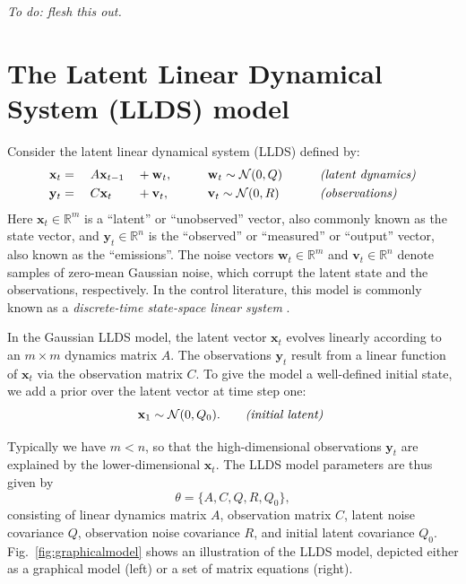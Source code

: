 \documentclass[10pt]{article}
\newcommand{\vx}{\mathbf{x}}
\newcommand{\vw}{\mathbf{w}}
\newcommand{\vy}{\mathbf{y}}
\newcommand{\vv}{\mathbf{v}}
\renewcommand{\RR}{\mathbb{R}}
\begin{document}
{\it To do: flesh this out.}

\section{The Latent Linear Dynamical System (LLDS) model} %


Consider the latent linear dynamical system (LLDS) defined by:
\begin{alignat}{5}
  \label{eq:latent}
  \vx_{t} &=\;&& A \vx_{t-1} &&+ \vw_t, \qquad && \vw_t \sim \Nrm(0,Q)
  \qquad  && \text{\it(latent dynamics)}\\
    \label{eq:obs}
  \vy_{t} &=\;&& C \vx_t &&+ \vv_t, \qquad && \vv_t \sim \Nrm(0,R) && 
  \text{\it(observations)}
\end{alignat}
Here $\vx_t \in \RR^m$ is a ``latent'' or ``unobserved'' vector, also commonly known as the state vector, and 
$\vy_t\in\RR^n$ is the ``observed'' or ``measured'' or ``output'' vector, also known as the ``emissions''.  The noise vectors $\vw_t \in \RR^m$ and $\vv_t\in \RR^n$ denote samples of zero-mean
Gaussian noise, which corrupt the latent state and the observations,
respectively.  In the control literature, this model is commonly known as a {\it discrete-time state-space linear system} \cite{HespanhaBook}.

In the Gaussian LLDS model, the latent vector $\vx_t$ evolves linearly according to an $m\times m$ dynamics matrix
$A$.  The observations $\vy_t$ result from a linear function of 
$\vx_t$ via the observation matrix $C$. To give the model a
well-defined initial state, we add a prior over the latent vector at time
step one:
\begin{equation}
  \label{eq:initial}
  \vx_1 \sim \Nrm(0, Q_0). \qquad \text{\it (initial latent) }
\end{equation}

Typically we have $m<n$, so that the high-dimensional observations
$\vy_t$ are explained by the lower-dimensional $\vx_t$.
The LLDS model parameters are thus given by
\begin{equation}
  \label{eq:theta}
  \theta = \{A,C,Q,R,Q_0\}, 
\end{equation}
consisting of linear dynamics matrix $A$, observation matrix $C$,
latent noise covariance $Q$, observation noise covariance
$R$, and initial latent covariance
$Q_0$. Fig.~\ref{fig:graphicalmodel} shows an illustration of the LLDS
model, depicted either as a graphical model (left) or a set of matrix
equations (right).
\end{document}
